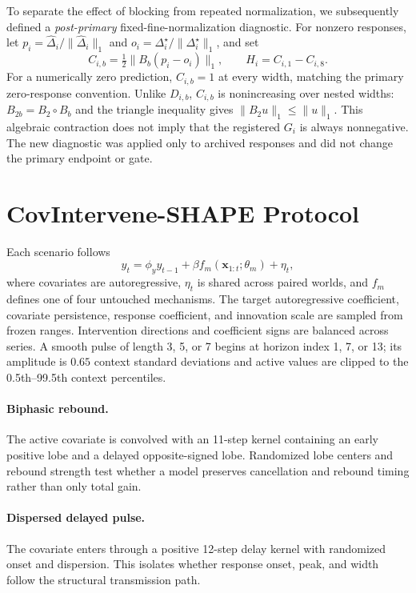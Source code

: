 \documentclass[conference]{IEEEtran}
\begin{document}
To separate the effect of blocking from repeated normalization, we subsequently
defined a \emph{post-primary} fixed-fine-normalization diagnostic. For nonzero
responses, let $p_i=\widehat\Delta_i/\|\widehat\Delta_i\|_1$ and
$o_i=\Delta_i^\star/\|\Delta_i^\star\|_1$, and set
\begin{equation}
C_{i,b}=\tfrac12\|B_b(p_i-o_i)\|_1,\qquad H_i=C_{i,1}-C_{i,8}.
\label{eq:fixed-fine}
\end{equation}
For a numerically zero prediction, $C_{i,b}=1$ at every width, matching the
primary zero-response convention. Unlike $D_{i,b}$, $C_{i,b}$ is nonincreasing
over nested widths: $B_{2b}=B_2\circ B_b$ and the triangle inequality gives
$\|B_2u\|_1\leq\|u\|_1$. This algebraic contraction does not imply that the
registered $G_i$ is always nonnegative. The new diagnostic was applied only to
archived responses and did not change the primary endpoint or gate.

\section{CovIntervene-SHAPE Protocol}
Each scenario follows
\begin{equation}
y_t=\phi_y y_{t-1}+\beta f_m(\mathbf{x}_{1:t};\theta_m)+\eta_t,
\label{eq:generator}
\end{equation}
where covariates are autoregressive, $\eta_t$ is shared across paired worlds, and
$f_m$ defines one of four untouched mechanisms. The target autoregressive coefficient,
covariate persistence, response coefficient, and innovation scale are sampled from
frozen ranges. Intervention directions and coefficient signs are balanced across
series. A smooth pulse of length 3, 5, or 7 begins at horizon index 1, 7, or 13; its
amplitude is $0.65$ context standard deviations and active values are clipped to the
0.5th--99.5th context percentiles.

\paragraph{Biphasic rebound.}
The active covariate is convolved with an 11-step kernel containing an early positive
lobe and a delayed opposite-signed lobe. Randomized lobe centers and rebound strength
test whether a model preserves cancellation and rebound timing rather than only total
gain.

\paragraph{Dispersed delayed pulse.}
The covariate enters through a positive 12-step delay kernel with randomized onset and
dispersion. This isolates whether response onset, peak, and width follow the structural
transmission path.
\end{document}
